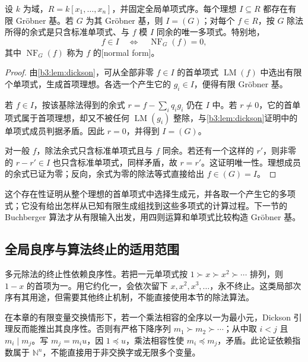 \begin{theorem}\label{b3:thm:groebner-existence-normal-form}
	设 \(k\) 为域，\(R=k[x_1,\ldots,x_n]\)，并固定全局单项式序。每个理想 \(I\subseteq R\) 都存在有限 Gröbner 基。若 \(G\) 为其 Gröbner 基，则 \(I=(G)\)；对每个 \(f\in R\)，按 \(G\) 除法所得的余式是只含标准单项式、与 \(f\) 模 \(I\) 同余的唯一多项式。特别地，
	\[
		f\in I\quad\Longleftrightarrow\quad\operatorname{NF}_G(f)=0,
	\]
	其中 \(\operatorname{NF}_G(f)\) 称为 \(f\) 的[normal form]。
\end{theorem}
\begin{proof}
	由\cref{b3:lem:dickson}，可从全部非零 \(f\in I\) 的首单项式 \(\operatorname{LM}(f)\) 中选出有限个单项式，生成首项理想。各选一个产生它的 \(g_i\in I\)，便得有限 Gröbner 基。

	若 \(f\in I\)，按该基除法得到的余式 \(r=f-\sum_iq_ig_i\) 仍在 \(I\) 中。若 \(r\ne0\)，它的首单项式属于首项理想，却又不被任何 \(\operatorname{LM}(g_i)\) 整除，与\cref{b3:lem:dickson}证明中的单项式成员判据矛盾。因此 \(r=0\)，并得到 \(I=(G)\)。

	对一般 \(f\)，除法余式只含标准单项式且与 \(f\) 同余。若还有一个这样的 \(r'\)，则非零的 \(r-r'\in I\) 也只含标准单项式，同样矛盾，故 \(r=r'\)。这证明唯一性。理想成员的余式已证为零；反向，余式为零的除法等式直接给出 \(f\in(G)=I\)。
\end{proof}

这个存在性证明从整个理想的首单项式中选择生成元，并各取一个产生它的多项式；它没有给出怎样从已知有限生成组找到这些多项式的计算过程。下一节的 Buchberger 算法才从有限输入出发，用四则运算和单项式比较构造 Gröbner 基。

\subsection{全局良序与算法终止的适用范围}
\label{b3:subsec:0801:04}

多元除法的终止性依赖良序性。若把一元单项式按 \(1\succ x\succ x^2\succ\cdots\) 排列，则 \(1-x\) 的首项为一。用它约化一，会依次留下 \(x,x^2,x^3,\ldots\)，永不终止。这类局部次序有其用途，但需要其他终止机制，不能直接使用本节的除法算法。

\ProseParagraphBreak
在本章的有限变量交换情形下，若一个乘法相容的全序以一为最小元，Dickson 引理反而能推出其良序性。否则有严格下降序列 \(m_1\succ m_2\succ\cdots\)；从中取 \(i<j\) 且 \(m_i\mid m_j\)。写 \(m_j=m_i u\)，因 \(1\preceq u\)，乘法相容性使 \(m_i\preceq m_j\)，矛盾。此论证依赖指数属于 \(\mathbb N^n\)，不能直接用于非交换字或无限多个变量。
